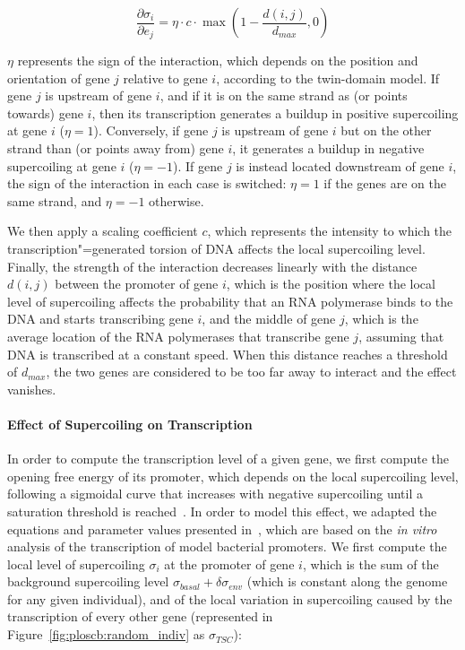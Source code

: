 \begin{equation}
  \frac{\partial\sigma_{i}}{\partial e_j} = \eta \cdot c \cdot \max(1-\frac{d(i, j)}{d_{max}}, 0)
  \label{eq:dsigmade}
\end{equation}

$\eta$ represents the sign of the interaction, which depends on the position and orientation of gene $j$ relative to gene $i$, according to the twin-domain model.
If gene $j$ is upstream of gene $i$, and if it is on the same strand as (or points towards) gene $i$, then its transcription generates a buildup in positive supercoiling at gene $i$ ($\eta = 1$).
Conversely, if gene $j$ is upstream of gene $i$ but on the other strand than (or points away from) gene $i$, it generates a buildup in negative supercoiling at gene $i$ ($\eta = -1$).
If gene $j$ is instead located downstream of gene $i$, the sign of the interaction in each case is switched: $\eta = 1$ if the genes are on the same strand, and $\eta = -1$ otherwise.

We then apply a scaling coefficient $c$, which represents the intensity to which the transcription"=generated torsion of DNA affects the local supercoiling level.
Finally, the strength of the interaction decreases linearly with the distance $d(i, j)$ between the promoter of gene $i$, which is the position where the local level of supercoiling affects the probability that an RNA polymerase binds to the DNA and starts transcribing gene $i$, and the middle of gene $j$, which is the average location of the RNA polymerases that transcribe gene $j$, assuming that DNA is transcribed at a constant speed.
When this distance reaches a threshold of $d_{max}$, the two genes are considered to be too far away to interact and the effect vanishes.

\paragraph{Effect of Supercoiling on Transcription}
In order to compute the transcription level of a given gene, we first compute the opening free energy of its promoter, which depends on the local supercoiling level, following a sigmoidal curve that increases with negative supercoiling until a saturation threshold is reached~\citep{forquet2021}.
In order to model this effect, we adapted the equations and parameter values presented in~\cite{elhoudaigui2019}, which are based on the \emph{in vitro} analysis of the transcription of model bacterial promoters.
We first compute the local level of supercoiling $\sigma_i$ at the promoter of gene $i$, which is the sum of the background supercoiling level $\sigma_{basal} + \delta\sigma_{env}$ (which is constant along the genome for any given individual), and of the local variation in supercoiling caused by the transcription of every other gene (represented in Figure~\ref{fig:ploscb:random_indiv} as $\sigma_{TSC}$):

